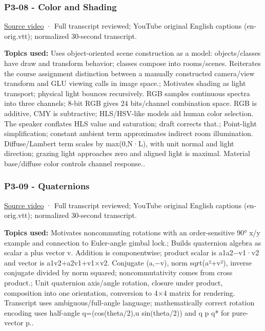 \subsubsection{P3-08 - Color and Shading}\label{04-visual-computing-ii-ch036-p3-08---color-and-shading}

\hypertarget{04-visual-computing-ii-ch036-p3-08---color-and-shading}{}

\href{https://www.youtube.com/watch?v=TEjDYtkLRdQ}{Source video} · Full transcript reviewed; YouTube original English captions (en-orig.vtt); normalized 30-second transcript.

\textbf{Topics used:} Uses object-oriented scene construction as a model: objects/classes have draw and transform behavior; classes compose into rooms/scenes. Reiterates the course assignment distinction between a manually constructed camera/view transform and GLU viewing calls in image space.; Motivates shading as light transport; physical light bounces recursively. RGB samples continuous spectra into three channels; 8-bit RGB gives 24 bits/channel combination space. RGB is additive, CMY is subtractive; HLS/HSV-like models aid human color selection. The speaker conflates HLS value and saturation; draft corrects that.; Point-light simplification; constant ambient term approximates indirect room illumination. Diffuse/Lambert term scales by max(0,N·L), with unit normal and light direction; grazing light approaches zero and aligned light is maximal. Material base/diffuse color controls channel response..

\subsubsection{P3-09 - Quaternions}\label{04-visual-computing-ii-ch036-p3-09---quaternions}

\hypertarget{04-visual-computing-ii-ch036-p3-09---quaternions}{}

\href{https://www.youtube.com/watch?v=mHVwd8gYLnI}{Source video} · Full transcript reviewed; YouTube original English captions (en-orig.vtt); normalized 30-second transcript.

\textbf{Topics used:} Motivates noncommuting rotations with an order-sensitive 90° x/y example and connection to Euler-angle gimbal lock.; Builds quaternion algebra as scalar a plus vector v. Addition is componentwise; product scalar is a1a2−v1·v2 and vector is a1v2+a2v1+v1×v2. Conjugate (a,−v), norm sqrt(a²+\textbar v\textbar²), inverse conjugate divided by norm squared; noncommutativity comes from cross product.; Unit quaternion axis/angle rotation, closure under product, composition into one orientation, conversion to 4×4 matrix for rendering. Transcript uses ambiguous/full-angle language; mathematically correct rotation encoding uses half-angle q=(cos(theta/2),u sin(theta/2)) and q p q* for pure-vector p..

